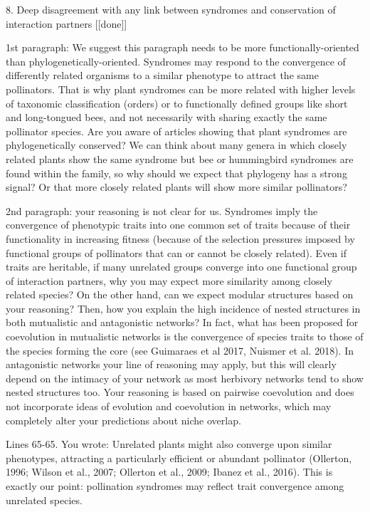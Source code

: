 \documentclass[12pt]{letter}
\newenvironment{refquote}{\bigskip \begin{it}}{\end{it}\smallskip}
\begin{document}
	8. Deep disagreement with any link between syndromes and conservation of interaction partners [[done]]

		\begin{refquote}
		1st paragraph: We suggest this paragraph needs to be more functionally-oriented than phylogenetically-oriented. Syndromes may respond to the convergence of differently related organisms to a similar phenotype to attract the same pollinators. That is why plant syndromes can be more related with higher levels of taxonomic classification (orders) or to functionally defined groups like short and long-tongued bees, and not necessarily with sharing exactly the same pollinator species. Are you aware of articles showing that plant syndromes are phylogenetically conserved? We can think about many genera in which closely related plants show the same syndrome but bee or hummingbird syndromes are found within the family, so why should we expect that phylogeny has a strong signal? Or that more closely related plants will show more similar pollinators?
		\end{refquote}

		\begin{refquote}
			2nd paragraph: your reasoning is not clear for us. Syndromes imply the convergence of phenotypic traits into one common set of traits because of their functionality in increasing fitness (because of the selection pressures imposed by functional groups of pollinators that can or cannot be closely related). Even if traits are heritable, if many unrelated groups converge into one functional group of interaction partners, why you may expect more similarity among closely related species? On the other hand, can we expect modular structures based on your reasoning? Then, how you explain the high incidence of nested structures in both mutualistic and antagonistic networks? In fact, what has been proposed for coevolution in mutualistic networks is the convergence of species traits to those of the species forming the core (see Guimaraes et al 2017, Nuismer et al. 2018). In antagonistic networks your line of reasoning may apply, but this will clearly depend on the intimacy of your network as most herbivory networks tend to show nested structures too. Your reasoning is based on pairwise coevolution and does not incorporate ideas of evolution and coevolution in networks, which may completely alter your predictions about niche overlap.
		\end{refquote}

		\begin{refquote}
			Lines 65-65. You wrote: Unrelated plants might also converge upon similar phenotypes, attracting a particularly efficient or abundant pollinator (Ollerton, 1996; Wilson et al., 2007; Ollerton et al., 2009; Ibanez et al., 2016). This is exactly our point: pollination syndromes may reflect trait convergence among unrelated species.
		\end{refquote}
\end{document}
